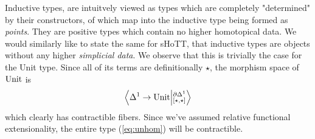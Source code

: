 \documentclass[main.tex]{subfiles}
\begin{document}
Inductive types, are intuitvely viewed as types which are completely "determined" by their constructors, of which map into the inductive type
being formed as \textit{points}. They are positive types which contain no higher homotopical data.
We would similarly like to state the same for sHoTT, that inductive types are objects without any higher \textit{simplicial data}. We observe that this is
trivially the case for the Unit type. Since all of its terms are definitionally $\star$, the morphism space of $\text{Unit}$ is
\begin{equation}
    \label{eq:unhom}
    \left\langle \Delta^1 \to \text{Unit} \middle|^{\partial\Delta^1}_{[\star,\star]}\right\rangle
\end{equation}
which clearly has contractible fibers. Since we've assumed relative functional extensionality, the entire type (\ref{eq:unhom}) will be contractible.
\end{document}
